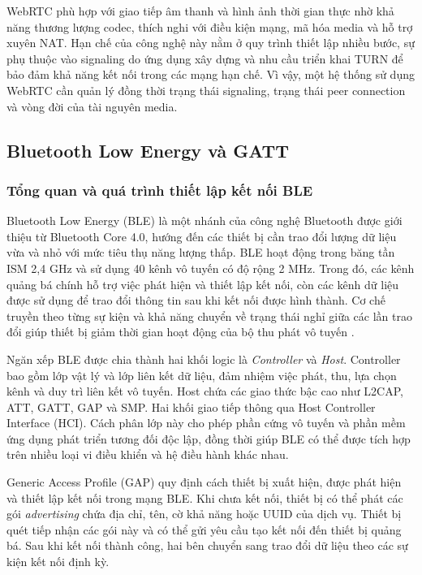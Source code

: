 WebRTC phù hợp với giao tiếp âm thanh và hình ảnh thời gian thực nhờ khả năng thương lượng codec, thích nghi với điều kiện mạng, mã hóa media và hỗ trợ xuyên NAT. Hạn chế của công nghệ này nằm ở quy trình thiết lập nhiều bước, sự phụ thuộc vào signaling do ứng dụng xây dựng và nhu cầu triển khai TURN để bảo đảm khả năng kết nối trong các mạng hạn chế. Vì vậy, một hệ thống sử dụng WebRTC cần quản lý đồng thời trạng thái signaling, trạng thái peer connection và vòng đời của tài nguyên media.

\subsection{Bluetooth Low Energy và GATT}

\subsubsection{Tổng quan và quá trình thiết lập kết nối BLE}

Bluetooth Low Energy (BLE) là một nhánh của công nghệ Bluetooth được giới thiệu từ Bluetooth Core 4.0, hướng đến các thiết bị cần trao đổi lượng dữ liệu vừa và nhỏ với mức tiêu thụ năng lượng thấp. BLE hoạt động trong băng tần ISM 2,4 GHz và sử dụng 40 kênh vô tuyến có độ rộng 2 MHz. Trong đó, các kênh quảng bá chính hỗ trợ việc phát hiện và thiết lập kết nối, còn các kênh dữ liệu được sử dụng để trao đổi thông tin sau khi kết nối được hình thành. Cơ chế truyền theo từng sự kiện và khả năng chuyển về trạng thái nghỉ giữa các lần trao đổi giúp thiết bị giảm thời gian hoạt động của bộ thu phát vô tuyến .

Ngăn xếp BLE được chia thành hai khối logic là \textit{Controller} và \textit{Host}. Controller bao gồm lớp vật lý và lớp liên kết dữ liệu, đảm nhiệm việc phát, thu, lựa chọn kênh và duy trì liên kết vô tuyến. Host chứa các giao thức bậc cao như L2CAP, ATT, GATT, GAP và SMP. Hai khối giao tiếp thông qua Host Controller Interface (HCI). Cách phân lớp này cho phép phần cứng vô tuyến và phần mềm ứng dụng phát triển tương đối độc lập, đồng thời giúp BLE có thể được tích hợp trên nhiều loại vi điều khiển và hệ điều hành khác nhau.

Generic Access Profile (GAP) quy định cách thiết bị xuất hiện, được phát hiện và thiết lập kết nối trong mạng BLE. Khi chưa kết nối, thiết bị có thể phát các gói \textit{advertising} chứa địa chỉ, tên, cờ khả năng hoặc UUID của dịch vụ. Thiết bị quét tiếp nhận các gói này và có thể gửi yêu cầu tạo kết nối đến thiết bị quảng bá. Sau khi kết nối thành công, hai bên chuyển sang trao đổi dữ liệu theo các sự kiện kết nối định kỳ.

